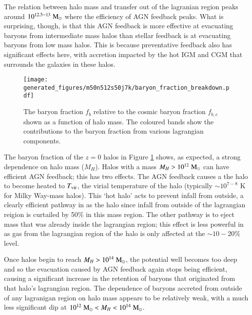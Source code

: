 The relation between halo mass and transfer out of the lagranian region peaks
around $10^{12.5-13}\;{\rm M}_{\odot}{}$ where the efficiency of AGN feedback peaks. What
is surprising, though, is that this AGN feedback is more effective at evacuating
baryons from intermediate mass halos than stellar feedback is at evacuating
baryons from low mass halos. This is because preventative feedback also has
significant effects here, with accretion impacted by the hot IGM and CGM that
surrounds the galaxies in these halos.

\begin{figure}
	\centering
	\texttt{[image: generated\_figures/m50n512s50j7k/baryon\_fraction\_breakdown.pdf]}
	\vspace{-0.7cm}
	\caption{The baryon fraction $f_b$ relative to the cosmic baryon fraction
	$f_{b, c}$ shown as a function of halo mass. The coloured bands show the
	contributions to the baryon fraction from various lagrangian components.}
	\label{fig:baryonfraction}
\end{figure}

The baryon fraction of the $z=0$ halos in Figure \ref{fig:baryonfraction}
shows, as expected, a strong dependence on halo mass ($M_H$). Halos with a
mass  $M_H > 10^{12} \;{\rm M}_{\odot}{}$ can have efficient AGN feedback; this has two
effects. The AGN feedback causes a the halo to become heated to $T_{\rm
vir}$, the virial temperature of the halo (typically $\sim10^{7-8}$ K for Milky
Way-mass halos). This `hot halo' acts to prevent infall from outside, a
clearly efficient pathway in \simba{} as the halo since infall from outside of
the lagrangian reigion is curtailed by 50\% in this mass region.  The other
pathway is to eject mass that was already inside the lagrangian region; this
effect is less powerful in \simba{} as gas from the lagrangian region of the
halo is only affected at the $\sim10-20\%$ level.

Once halos begin to reach $M_H > 10^{14} \;{\rm M}_{\odot}{}$, the potential well
becomes too deep and so the evacuation caused by AGN feedback again stops
being efficient, causing a significant increase in the retention of baryons
that originated from that halo's lagrangian region. The dependence of baryons
accreted from outside of any lagranigan region on halo mass appears to be
relatively weak, with a much less significant dip at $10^{12} \;{\rm M}_{\odot}{} < M_H
< 10^{14} \;{\rm M}_{\odot}{}$.
